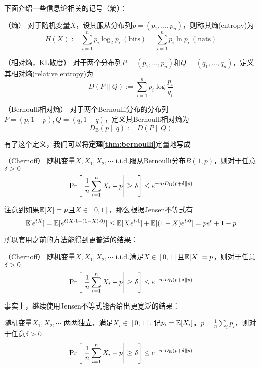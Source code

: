 下面介绍一些信息论相关的记号（熵）：
\begin{definition} （熵）
    对于随机变量$X$，设其服从分布列$p=(p_1, \dots, p_n)$，则称其熵(entropy)为 
    \[
    H(X) := \sum_{i=1}^n p_i \log_2 p_i \ (\mathrm{bits}) = \sum_{i=1}^n p_i \ln p_i \ (\mathrm{nats})
    \]
\end{definition}

\begin{definition}（相对熵，KL散度）
    对于两个分布列$P = (p_1, \dots, p_n)$和$Q = (q_1, \dots, q_n)$，定义其相对熵(relative entropy)为 
    \[
    D(P\|Q) := \sum_{i=1}^n p_i \log \dfrac{p_i}{q_i}
    \]
\end{definition}

\begin{definition}（Bernoulli相对熵）
    对于两个Bernoulli分布的分布列$P=(p, 1-p), Q=(q, 1-q)$，定义其Bernoulli相对熵为 
    \[
    D_{\mathrm{B}}(p\|q) := D(P\| Q)
    \]
\end{definition}

有了这个定义，我们可以将\textbf{定理\ref{thm:bernoulli}}定量地写成 
\begin{theorem} （Chernoff） \label{thm:chernoff}
    随机变量$X, X_1, X_2, \cdots$ i.i.d.服从Bernoulli分布$B(1,p)$，则对于任意$\delta > 0$ 
    \[
    \Pr\left[
        \left\vert
            \dfrac 1n \sum_{i=1}^n X_i - p
        \right\vert \ge \delta
    \right] \le e^{-n\cdot D_{\mathrm{B}}(p + \delta \| p)}
    \]
\end{theorem}

注意到如果$\mathbb{E}[X]=p$且$X \in [0,1]$，那么根据Jensen不等式有 
\[
\mathbb{E}[e^{tX}] = \mathbb{E}[e^{t(X\cdot 1 + (1-X)\cdot 0)}] \le \mathbb{E}[Xe^{t\cdot 1}] + \mathbb{E}[(1-X)e^{t\cdot 0}] =pe^t + 1-p
\]

所以套用之前的方法能得到更普适的结果：
\begin{corollary} （Chernoff）
    随机变量$X, X_1, X_2, \cdots$ i.i.d.满足$X\in [0, 1]$且$\mathbb{E}[X]=p$，则对于任意$\delta > 0$ 
    \[
    \Pr\left[
        \left\vert
            \dfrac 1n \sum_{i=1}^n X_i - p
        \right\vert \ge \delta
    \right] \le e^{-n\cdot D_{\mathrm{B}}(p + \delta \| p)}
    \]
\end{corollary}

事实上，继续使用Jensen不等式能否给出更宽泛的结果：
\begin{corollary} 
    随机变量$X_1, X_2, \cdots$ 两两独立，满足$X_i\in [0,1]$. 记$p_i = \mathbb{E}[X_i]$，$p = \frac{1}{n}\sum_i p_i$，则对于任意$\delta > 0$
    \[
    \Pr\left[
        \left\vert
            \dfrac 1n \sum_{i=1}^n X_i - p
        \right\vert \ge \delta
    \right] \le e^{-n\cdot D_{\mathrm{B}}(p + \delta \| p)}
    \]
\end{corollary}


